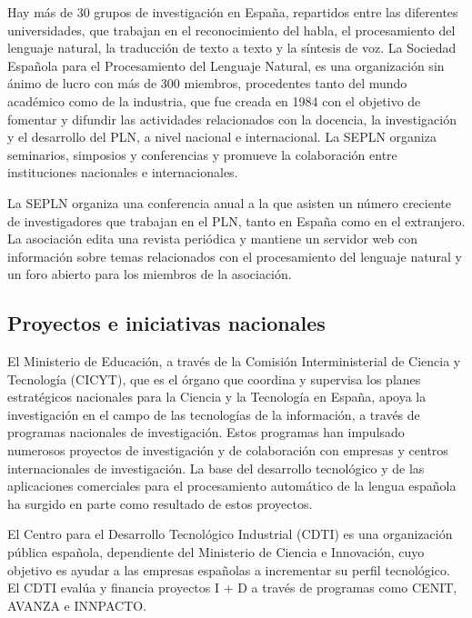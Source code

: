 \begin{multicols}{2}
Hay más de 30 grupos de investigación en España, repartidos entre las diferentes universidades, que trabajan en el reconocimiento del habla, el procesamiento del lenguaje natural, la traducción de texto a texto y la síntesis de voz. La Sociedad Española para el Procesamiento del Lenguaje Natural, es una organización sin ánimo de lucro con más de 300 miembros, procedentes tanto del mundo académico como de la industria, que fue creada en 1984 con el objetivo de fomentar y difundir las actividades relacionados con la docencia, la investigación y el desarrollo del PLN, a nivel nacional e internacional. La SEPLN organiza seminarios, simposios y conferencias y promueve la colaboración entre instituciones nacionales e internacionales.

La SEPLN organiza una conferencia anual a la que asisten un número creciente de investigadores que trabajan en el  PLN, tanto en España como en el extranjero. La asociación edita una revista periódica y mantiene un servidor web con información sobre temas relacionados con el procesamiento del lenguaje natural y un foro abierto para los miembros de la asociación. 

\subsection{Proyectos e iniciativas nacionales}

El Ministerio de Educación, a través de la Comisión Interministerial de Ciencia y Tecnología (CICYT), que es el órgano que coordina y supervisa los planes estratégicos nacionales para la Ciencia y la Tecnología en España, apoya la investigación en el campo de las tecnologías de la información, a través de programas nacionales de investigación. Estos programas han impulsado numerosos proyectos de investigación y de colaboración con empresas y centros internacionales de investigación. La base del desarrollo tecnológico y de las aplicaciones comerciales para el procesamiento automático de la lengua española ha surgido en parte como resultado de estos proyectos.

El Centro para el Desarrollo Tecnológico Industrial (CDTI) es una organización pública española, dependiente del Ministerio de Ciencia e Innovación, cuyo objetivo es ayudar a las empresas españolas a incrementar su perfil tecnológico. El CDTI evalúa y financia proyectos I + D a través de programas como CENIT, AVANZA e INNPACTO.


\end{multicols}

